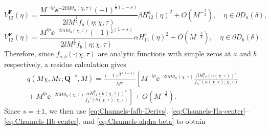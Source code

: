 \begin{equation}
V_{12}^\mathbf{F}(\eta)=\frac{M^{-\ii p}\ee^{-2\ii M\vartheta_a(\chi,\tau)}(-1)^{\frac{1}{2}(1-s)}}{2\ii M^\frac{1}{2}f_a(\eta;\chi,\tau)}
\beta H^a_{12}(\eta)^2 + O(M^{-\frac{3}{2}}),\quad
\eta\in\partial D_a(\delta),
\end{equation}
\begin{equation}
V_{12}^\mathbf{F}(\eta)=\frac{M^{\ii p}\ee^{-2\ii M\vartheta_b(\chi,\tau)}(-1)^{\frac{1}{2}(1-s)}}{2\ii M^\frac{1}{2}f_b(\eta;\chi,\tau)}
\alpha H^b_{11}(\eta)^2 + O(M^{-\frac{3}{2}}),\quad
\eta\in\partial D_b(\delta).
\end{equation}
Therefore, since $f_{a,b}(\cdot;\chi,\tau)$ are analytic functions with simple zeros at $a$ and $b$ respectively, a residue calculation gives
\begin{multline}
q(M\chi,M\tau;\mathbf{Q}^{-s},M)=\frac{(-1)^{\frac{1}{2}(1-s)}}{M^\frac{1}{2}}\left[M^{-\ii p}\ee^{-2\ii M\vartheta_a(\chi,\tau)}\frac{\beta H_{12}^a(a(\chi,\tau))^2}{f_a'(a(\chi,\tau);\chi,\tau)}\right.\\
\left. {}+M^{\ii p}\ee^{-2\ii M\vartheta_b(\chi,\tau)}\frac{\alpha H_{11}^b(b(\chi,\tau))^2}{f_b'(b(\chi,\tau);\chi,\tau)}\right]+O(M^{-\frac{3}{2}}).
\end{multline}
Since $s=\pm 1$,
we then use \eqref{eq:Channels-fafb-Derivs}, \eqref{eq:Channels-Ha-center}--\eqref{eq:Channels-Hb-center}, and \eqref{eq:Channels-alpha-beta} to obtain
